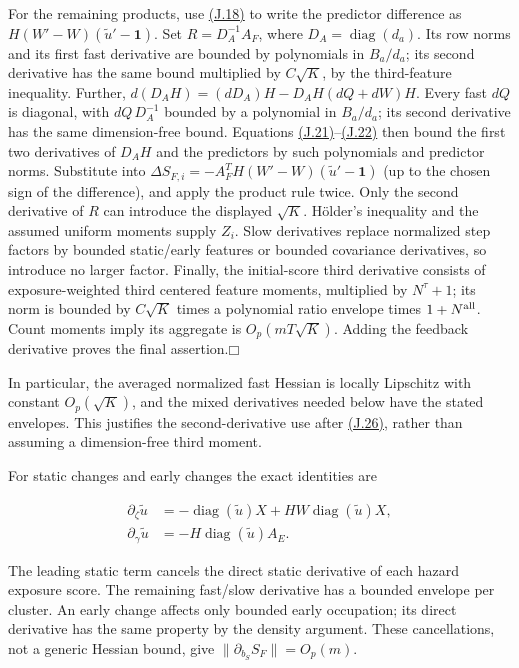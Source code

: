 \documentclass[11pt]{article}
\providecommand{\square}{\mdlgwhtsquare}
\begin{document}
For the remaining products, use \hyperref[eq:J.18]{(J.18)} to write the predictor difference as \(H(W'-W)(\widetilde u'-\mathbf1)\). Set \(R=D_A^{-1}A_F\), where \(D_A=\operatorname{diag}(d_a)\). Its row norms and its first fast derivative are bounded by polynomials in \(B_a/d_a\); its second derivative has the same bound multiplied by \(C\sqrt K\), by the third-feature inequality. Further,
\(d(D_AH)=(dD_A)H-D_AH(dQ+dW)H\).
Every fast \(dQ\) is diagonal, with \(dQ\,D_A^{-1}\) bounded by a polynomial in \(B_a/d_a\); its second derivative has the same dimension-free bound. Equations \hyperref[eq:J.21]{(J.21)}--\hyperref[eq:J.22]{(J.22)} then bound the first two derivatives of \(D_AH\) and the predictors by such polynomials and predictor norms. Substitute into
\(\Delta S_{F,i}=-A_F^TH(W'-W)(\widetilde u'-\mathbf1)\)
(up to the chosen sign of the difference), and apply the product rule twice. Only the second derivative of \(R\) can introduce the displayed \(\sqrt K\). Hölder's inequality and the assumed uniform moments supply \(Z_i\). Slow derivatives replace normalized step factors by bounded static/early features or bounded covariance derivatives, so introduce no larger factor. Finally, the initial-score third derivative consists of exposure-weighted third centered feature moments, multiplied by \(N^\tau+1\); its norm is bounded by \(C\sqrt K\) times a polynomial ratio envelope times \(1+N^{\rm all}\). Count moments imply its aggregate is \(O_p(mT\sqrt K)\). Adding the feedback derivative proves the final assertion.\hfill$\square$

In particular, the averaged normalized fast Hessian is locally Lipschitz with constant \(O_p(\sqrt K)\), and the mixed derivatives needed below have the stated envelopes. This justifies the second-derivative use after \hyperref[eq:J.26]{(J.26)}, rather than assuming a dimension-free third moment.

For static changes and early changes the exact identities are

\begin{equation*}
\begin{aligned}
\partial_\zeta\widetilde u
 &=-\operatorname{diag}(\widetilde u)X
       +HW\operatorname{diag}(\widetilde u)X,\\
\partial_\gamma\widetilde u
 &=-H\operatorname{diag}(\widetilde u)A_E.
\end{aligned}\tag{J.23}\label{eq:J.23}
\end{equation*}

The leading static term cancels the direct static derivative of each hazard exposure score. The remaining fast/slow derivative has a bounded envelope per cluster. An early change affects only bounded early occupation; its direct derivative has the same property by the density argument. These cancellations, not a generic Hessian bound, give \(\|\partial_{b_S}S_F\|=O_p(m)\).
\end{document}
